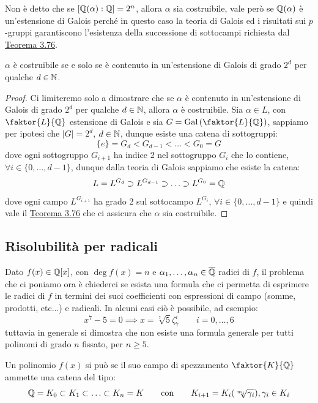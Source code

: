 \documentclass[11pt]{scrartcl}
\begin{document}
\begin{remark}
    Non è detto che se $[\mathbb Q(\alpha) : \mathbb Q] = 2^n$, allora $\alpha$ sia costruibile, vale però se $\mathbb Q(\alpha)$ è un'estensione di Galois perché in questo caso la teoria di Galois ed i risultati sui $p$-gruppi garantiscono l'esistenza 
    della successione di sottocampi richiesta dal \hyperref[3.76]{Teorema 3.76}.
\end{remark}

\begin{theorem}
    $\alpha$ è costruibile se e solo se è contenuto in un'estensione di Galois di grado $2^d$ per qualche $d \in \mathbb N$.
\end{theorem}

\begin{proof}
    Ci limiteremo solo a dimostrare che se $\alpha$ è contenuto in un'estensione di Galois di grado $2^d$ per qualche $d \in \mathbb N$, allora $\alpha$ è costruibile. Sia $\alpha \in L$, con $\faktor{L}{\QQ}$ estensione di Galois e sia $G = \Gal\left(\faktor{L}{\QQ}\right)$, sappiamo 
    per ipotesi che $|G| = 2^d$, $d \in \mathbb N$, dunque esiste una catena di sottogruppi:
    \[ \{e\} = G_d < G_{d-1} < \ldots < G_0 = G
        \] 
    dove ogni sottogruppo $G_{i+1}$ ha indice 2 nel sottogruppo $G_i$ che lo contiene, $\forall i \in \{0,\ldots,d-1\}$, dunque dalla teoria di Galois sappiamo che esiste la catena:
    \[ L = L^{G_d} \supset L^{G_{d-1}} \supset \ldots \supset L^{G_0} = \mathbb Q
        \]
    dove ogni campo $L^{G_{i+1}}$ ha grado 2 sul sottocampo $L^{G_{i}}$, $\forall i \in \{0,\ldots,d-1\}$ e quindi vale il \hyperref[3.76]{Teorema 3.76} che ci assicura che $\alpha$ sia costruibile.
\end{proof}

\newpage
\subsection{Risolubilità per radicali}
Dato $f(x) \in \mathbb Q[x]$, con $\deg f(x) = n$ e $\alpha_1,\ldots,\alpha_n \in \overline {\mathbb Q}$ radici di $f$, il problema che ci poniamo ora è chiederci se esista una formula che ci permetta di esprimere le radici di $f$
in termini dei suoi coefficienti con espressioni di campo (somme, prodotti, etc...) e radicali. In alcuni casi ciò è possibile, ad esempio:
\[ x^7 - 5 = 0 \implies x = \sqrt[7]{5}\zeta_7^i \qquad i = 0,\ldots,6
    \]
tuttavia in generale  si dimostra che non esiste una formula generale per tutti polinomi di grado $n$ fissato, per $n \geq 5$.

\begin{definition}
    Un polinomio $f(x)$ si può  se il suo campo di spezzamento $\faktor{K}{\QQ}$ ammette una catena del tipo:
    \[ \mathbb Q = K_0 \subset K_1 \subset \ldots \subset K_n = K \qquad \text{con} \qquad K_{i+1} = K_i(\sqrt[m_i]{\gamma_i}), \gamma_i \in K_i
        \]
\end{definition}
\end{document}
